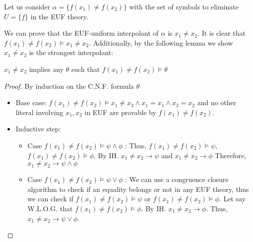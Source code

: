 \begin{example}
  Let us consider 
  $\alpha = \{f(x_1) \neq f(x_2)\}$
  with the set of symbols to eliminate $U = \{f\}$ in the
  EUF theory.

  We can prove that the EUF-uniform interpolant of
  $\alpha$ is $x_1 \neq x_2$. It is clear that 
  $f(x_1) \neq f(x_2) \models x_1 \neq x_2$. 
  Additionally, by the following lemma we show $x_1 \neq x_2$
  is the strongest interpolant:

  \begin{lemma}
    $x_1 \neq x_2$ implies any $\theta$ such that 
    $f(x_1) \neq f(x_2) \models \theta$
  \end{lemma}
  \begin{proof}
    By induction on the C.N.F. formula $\theta$
    \begin{itemize}
      \item Base case: $f(x_1) \neq f(x_2) \models x_1 \neq x_2 
        \land x_1 = x_1 \land x_2 = x_2$ and no other 
        literal involving $x_1, x_2$ in EUF are provable by
        $f(x_1) \neq f(x_2)$.
      \item Inductive step:
        \begin{itemize}
          \item Case $f(x_1) \neq f(x_2) \models \psi \land \phi$ :
            Thus, $f(x_1) \neq f(x_2) \models \psi$, $f(x_1) \neq f(x_2) \models \phi$.
            By IH. $x_1 \neq x_2 \rightarrow \psi$ and $x_1 \neq x_2 \rightarrow \phi$
            Therefore, $x_1 \neq x_2 \rightarrow \psi \land \phi$
          \item Case $f(x_1) \neq f(x_2) \models \psi \lor \phi$ : 
            We can use a congruence closure algorithm 
            to check if an equality belongs or not 
            in any EUF theory, thus we can check if 
            $f(x_1) \neq f(x_2) \models \psi$ or 
            $f(x_1) \neq f(x_2) \models \phi$. Let say W.L.O.G. 
            that $f(x_1) \neq f(x_2) \models \phi$. 
            By IH. $x_1 \neq x_2 \rightarrow \phi$.
            Thus, $x_1 \neq x_2 \rightarrow \psi \lor \phi$.
        \end{itemize}
    \end{itemize}
  \end{proof}

\end{example}

